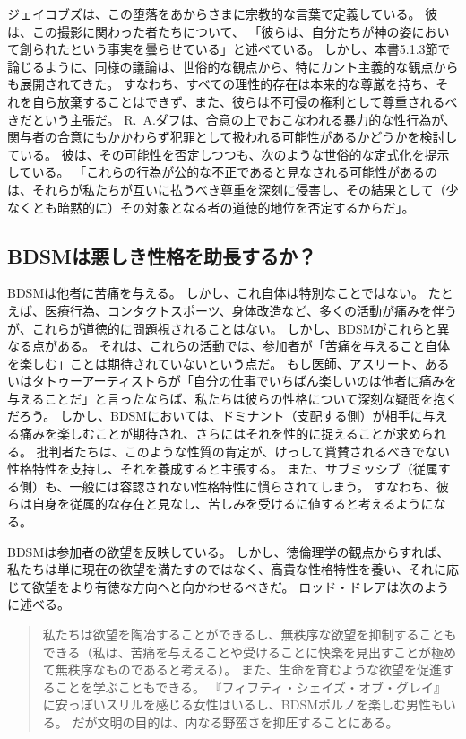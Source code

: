 \documentclass[paper=a4,book,openany]{jlreq}
\begin{document}
ジェイコブズは、この堕落をあからさまに宗教的な言葉で定義している。
彼は、この撮影に関わった者たちについて、 「彼らは、自分たちが神の姿において創られたという事実を曇らせている」\citep{jacobs03:_in_which_noah_millm_i}と述べている。
しかし、本書5.1.3節で論じるように、同様の議論は、世俗的な観点から、特にカント主義的な観点からも展開されてきた。
すなわち、すべての理性的存在は本来的な尊厳を持ち、それを自ら放棄することはできず、また、彼らは不可侵の権利として尊重されるべきだという主張だ。
R.~A.ダフは、合意の上でおこなわれる暴力的な性行為が、関与者の合意にもかかわらず犯罪として扱われる可能性があるかどうかを検討している。
彼は、その可能性を否定しつつも、次のような世俗的な定式化を提示している。
「これらの行為が公的な不正であると見なされる可能性があるのは、それらが私たちが互いに払うべき尊重を深刻に侵害し、その結果として（少なくとも暗黙的に）その対象となる者の道徳的地位を否定するからだ」\citep[p.232]{duff14:_towar_modes_legal_moral}。

\subsection{BDSMは悪しき性格を助長するか？}

BDSMは他者に苦痛を与える。
しかし、これ自体は特別なことではない。
たとえば、医療行為、コンタクトスポーツ、身体改造など、多くの活動が痛みを伴うが、これらが道徳的に問題視されることはない。
しかし、BDSMがこれらと異なる点がある。
それは、これらの活動では、参加者が「苦痛を与えること自体を楽しむ」ことは期待されていないという点だ。
もし医師、アスリート、あるいはタトゥーアーティストらが「自分の仕事でいちばん楽しいのは他者に痛みを与えることだ」と言ったならば、私たちは彼らの性格について深刻な疑問を抱くだろう。
しかし、BDSMにおいては、ドミナント（支配する側）が相手に与える痛みを楽しむことが期待され、さらにはそれを性的に捉えることが求められる。
批判者たちは、このような性質の肯定が、けっして賞賛されるべきでない性格特性を支持し、それを養成すると主張する。
また、サブミッシブ（従属する側）も、一般には容認されない性格特性に慣らされてしまう。
すなわち、彼らは自身を従属的な存在と見なし、苦しみを受けるに値すると考えるようになる。

BDSMは参加者の欲望を反映している。
しかし、徳倫理学の観点からすれば、私たちは単に現在の欲望を満たすのではなく、高貴な性格特性を養い、それに応じて欲望をより有徳な方向へと向かわせるべきだ。
ロッド・ドレアは次のように述べる。

\begin{quote}
  私たちは欲望を陶冶することができるし、無秩序な欲望を抑制することもできる（私は、苦痛を与えることや受けることに快楽を見出すことが極めて無秩序なものであると考える）。
また、生命を育むような欲望を促進することを学ぶこともできる。
『フィフティ・シェイズ・オブ・グレイ』に安っぽいスリルを感じる女性はいるし、BDSMポルノを楽しむ男性もいる。
だが文明の目的は、内なる野蛮さを抑圧することにある。
\citep{dreher12:_million_shades_of_gross}
\end{quote}
\end{document}
